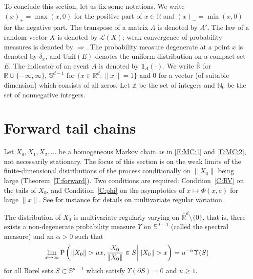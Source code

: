 \documentclass{aptpubarxiv}
\numberwithin{equation}{section}
\begin{document}
To conclude this section, let us fix some notations. We write $(x)_+=\max(x,0)$ for the positive part of $x \in\mathbb{R}$ and $(x)_-=\min(x,0)$ for the negative part. The transpose of a matrix $A$ is denoted by $A'$. The law of a random vector $X$ is denoted by ${\mathcal{L}}(X)$; weak convergence of probability measures is denoted by $\Rightarrow$. The probability measure degenerate at a point $x$ is denoted by $\delta_x$, and $\mbox{Unif}(E)$ denotes the uniform distribution on a compact set $E$. The indicator of an event $A$ is denoted by ${\boldsymbol{1}}_A(\cdot)$. We write $\overline{\mathbb{R}}$ for $\mathbb{R}\cup\{-\infty,\infty\}$, $\mathbb{S}^{d-1}$ for $\{x \in \mathbb{R}^d: \|x\|=1\}$ and $0$ for a vector (of suitable dimension) which consists of all zeros. Let ${\mathbb{Z}}$ be the set of integers and ${\mathbb{N}}_0$ be the set of nonnegative integers.

\section{Forward tail chains}
\label{S:forward}

Let $X_0, X_1, X_2, \ldots$ be a homogeneous Markov chain as in \eqref{E:MC:1} and \eqref{E:MC:2}, not necessarily stationary. The focus of this section is on the weak limits of the finite-dimensional distributions of the process conditionally on $\|X_0\|$ being large (Theorem~\ref{T:forward}). Two conditions are required: Condition~\ref{C:RV} on the tails of $X_0$, and Condition~\ref{C:phi} on the asymptotics of $x \mapsto \Phi(x, e)$ for large $\|x\|$. See for instance \citet{Re07} for details on multivariate regular variation.

\begin{cond}
\label{C:RV}
The distribution of $X_0$ is multivariate regularly varying on $\overline{\mathbb{R}}^d \setminus \{0\}$, that is, there exists a non-degenerate probability measure $\Upsilon$ on $\mathbb{S}^{d-1}$ (called the spectral measure) and an $\alpha>0$ such that
\begin{equation}
\label{E:RV}
      \lim_{x \to \infty} {\mathrm{P}}\left(\|X_0\|>ux, \frac{X_0}{\|X_0\|} \in S\, \vrule \, \|X_0\| > x\right) = u^{-\alpha}\Upsilon(S) 
\end{equation}
for all Borel sets $S \subset \mathbb{S}^{d-1}$ which satisfy $\Upsilon(\partial S)=0$ and $u \geq 1$. \end{cond}
\end{document}
